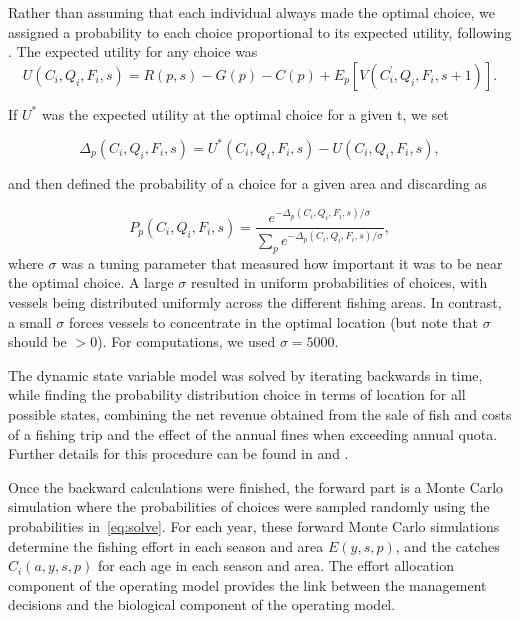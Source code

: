 \documentclass[12pt,oneline,a4paper,numbib]{ouparticle}
\numberwithin{equation}{subsection} %
\begin{document}
Rather than assuming that each individual always made the optimal choice, we assigned a probability to each choice proportional to its expected utility, following \cite{Dowling2011}. The expected utility for any choice was
\begin{equation}
U (C_i, Q_i, F_i, s) = R(p, s)- G(p) - C(p) + E_{p}[V (C_i^\prime, Q_i, F_i, s+1)].
\end{equation}

If $U^*$ was the expected utility at the optimal choice for a given t, we set

\begin{equation}
\Delta_{p}(C_i, Q_i, F_i, s) =  U^* (C_i, Q_i, F_i, s) - U (C_i, Q_i, F_i, s),
\end{equation}

and then defined the probability of a choice for a given area and discarding as	

\begin{equation} \label{eq:solve}
P_{p}(C_i, Q_i, F_i, s) = \frac
                {e^{ -\Delta_{p}(C_i, Q_i, F_i, s)/\sigma}}
                {\sum_p e^{ -\Delta_{p}(C_i, Q_i, F_i, s)/\sigma}},
\end{equation}
where $\sigma$ was a tuning parameter that measured how important it was to be near the optimal choice. A large $\sigma$ resulted in uniform probabilities of choices, with vessels being distributed uniformly across the different fishing areas. In contrast, a small $\sigma$ forces vessels to concentrate in the optimal location (but note that $\sigma$ should be $> 0$). For computations, we used $\sigma = 5000$. %

The dynamic state variable model was solved by iterating backwards in time, while finding the probability distribution choice in terms of location for all possible states, combining the net revenue obtained from the sale of fish and costs of a fishing trip and the effect of the annual fines when exceeding annual quota. Further details for this procedure can be found in \cite{Alzorriz2018, Batsleer2016} and \cite{Dowling2011}.

Once the backward calculations were finished, the forward part is a Monte Carlo simulation where the probabilities of choices were sampled randomly using the probabilities in~\ref{eq:solve}. For each year, these forward Monte Carlo simulations determine the fishing effort in each season and area $E(y,s,p)$, and the catches $C_i (a, y, s, p)$ for each age in each season and area. The effort allocation component of the operating model provides the link between the management decisions and the biological component of the operating model.
\end{document}
